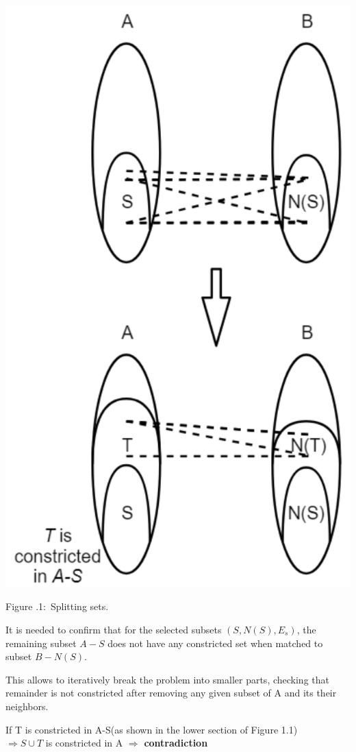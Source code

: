 \documentclass[twoside]{article}
\newcounter{lecnum}
\newcommand{\fig}[3]{
      \vspace{#2}
      \begin{center}
      Figure \thelecnum.#1:~#3
      \end{center}
  }
\begin{document}
\begin{minipage}{0.25\textwidth}
\begin{center}
\includegraphics[scale=0.25]{split.png}
\fig{1}{0in}{Splitting sets.}
\end{center}
\end{minipage}
\begin{minipage}{0.75\textwidth}
It is needed to confirm that for the selected subsets $(S, N(S), E_s)$, the remaining subset $A-S$ does not have any constricted set when matched to subset $B-N(S)$.
\vspace{10mm}

This allows to iteratively break the problem into smaller parts, checking that remainder is not constricted after removing any given subset of A and its their neighbors.

\vspace{15mm}
If T is constricted in A-S(as shown in the lower section of Figure 1.1)\\
$\Rightarrow S \cup T$ is constricted in A $\Rightarrow$ \textbf{contradiction}
\vspace{20mm}

\end{minipage}
\end{document}
